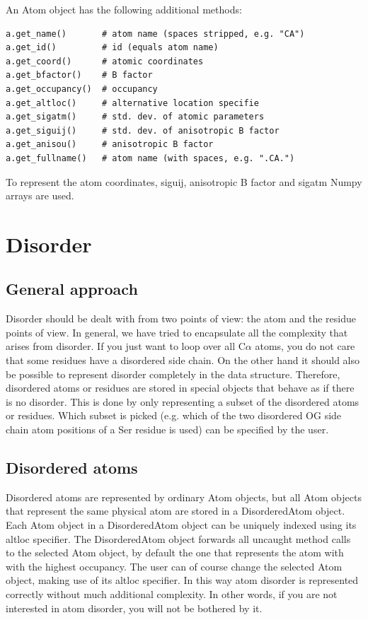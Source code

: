 \documentclass{report}
\begin{document}
An Atom object has the following additional methods:

\begin{verbatim}
a.get_name()       # atom name (spaces stripped, e.g. "CA")
a.get_id()         # id (equals atom name)
a.get_coord()      # atomic coordinates
a.get_bfactor()    # B factor
a.get_occupancy()  # occupancy
a.get_altloc()     # alternative location specifie
a.get_sigatm()     # std. dev. of atomic parameters
a.get_siguij()     # std. dev. of anisotropic B factor
a.get_anisou()     # anisotropic B factor
a.get_fullname()   # atom name (with spaces, e.g. ".CA.")
\end{verbatim}

To represent the atom coordinates, siguij, anisotropic B factor and sigatm Numpy
arrays are used.

\section{Disorder}

\subsection{General approach\label{disorder problems}}

Disorder should be dealt with from two points of view: the atom and the residue
points of view. In general, we have tried to encapsulate all the complexity that
arises from disorder. If you just want to loop over all C\( \alpha  \) atoms,
you do not care that some residues have a disordered side chain. On the other
hand it should also be possible to represent disorder completely in the data
structure. Therefore, disordered atoms or residues are stored in special objects
that behave as if there is no disorder. This is done by only representing a
subset of the disordered atoms or residues. Which subset is picked (e.g. which
of the two disordered OG side chain atom positions of a Ser residue is used)
can be specified by the user.

\subsection{Disordered atoms\label{disordered atoms}}

Disordered atoms are represented by ordinary Atom objects, but all Atom objects
that represent the same physical atom are stored in a DisorderedAtom object.
Each Atom object in a DisorderedAtom object can be uniquely indexed using its
altloc specifier. The DisorderedAtom object forwards all uncaught method calls
to the selected Atom object, by default the one that represents the atom with
with the highest occupancy. The user can of course change the selected Atom
object, making use of its altloc specifier. In this way atom disorder is represented
correctly without much additional complexity. In other words, if you are not
interested in atom disorder, you will not be bothered by it.
\end{document}
